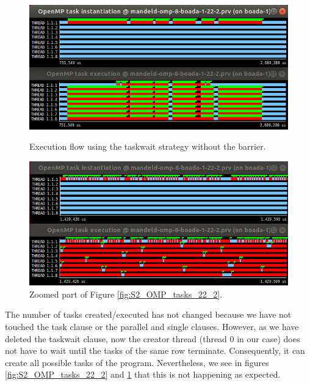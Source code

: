 \documentclass[12pt, a4paper]{article}
\begin{document}
\begin{figure}[H]

\begin{minipage}[t]{0.5\linewidth}
  \centering
  \includegraphics[scale=0.345]{./S2_OMP_tasks_22_2}
  \caption{Execution flow using the taskwait strategy without the barrier.}
  \label{fig:S2_OMP_tasks_22_2}
\end{minipage}%
\hspace{0cm}
\begin{minipage}[t]{0.5\linewidth}
  \centering
  \includegraphics[scale=0.345]{./S2_OMP_tasks_22_2_zoom}
  \caption{Zoomed part of Figure \ref{fig:S2_OMP_tasks_22_2}.}
  \label{fig:S2_OMP_tasks_22_2_zoom}
\end{minipage}
\end{figure}

The number of tasks created/executed has not changed because we have not touched the task clause or the parallel and single clauses. However, as we have deleted the taskwait clause, now the creator thread (thread 0 in our case) does not have to wait until the tasks of the same row terminate. Consequently, it can create all possible tasks of the program. Nevertheless, we see in figures \ref{fig:S2_OMP_tasks_22_2} and \ref{fig:S2_OMP_tasks_22_2_zoom} that this is not happening as expected.
\end{document}
